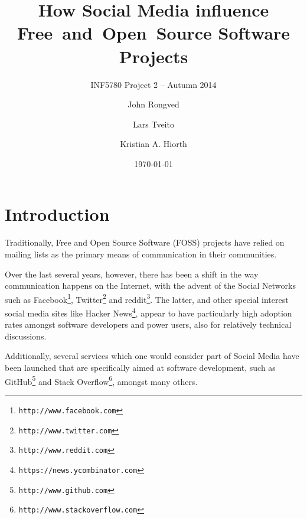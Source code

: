 \documentclass[a4paper,11pt]{article} %
\title{How Social Media influence \hbox{Free and Open Source} Software Projects}
\subtitle{INF5780 Project 2 -- Autumn 2014}
\date{\today}
\author{John Rongved \and Lars Tveito \and Kristian A. Hiorth}
\begin{document}
\ififorside{}

\tableofcontents{}
\newpage

\section{Introduction}

Traditionally, Free and Open Source Software (FOSS) projects have
relied on mailing lists as the primary means of communication in
their communities. %

Over the last several years, however, there has been a shift in the way
communication happens on the Internet, with the advent of the Social
Networks such as Facebook\footnote{\texttt{http://www.facebook.com}}, Twitter\footnote{\texttt{http://www.twitter.com}} and reddit\footnote{\texttt{http://www.reddit.com}}.
The latter, and other special
interest social media sites like Hacker News\footnote{\texttt{https://news.ycombinator.com}}, appear to have particularly
high adoption rates amongst software developers and power users, also for
relatively technical discussions.

Additionally, several services which one would consider part of Social Media
have been launched that are specifically aimed at software development, such
as GitHub\footnote{\texttt{http://www.github.com}} and Stack Overflow\footnote{\texttt{http://www.stackoverflow.com}}, amongst many others.

\end{document}
